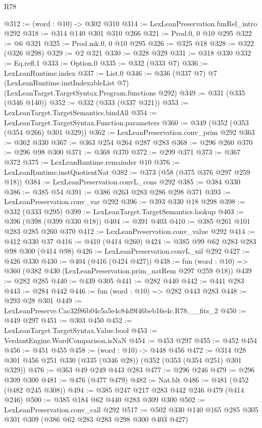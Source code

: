 \begin{lexlean}{R78}
\begin{coremodule}
@312 := (word : @10) -> @302 @310
@314 := LexLeanPreservation.funRel_intro @292
@318 := @314 @140 @301 @310 @266
@321 := Prod.{0, 0} @10 @295
@322 := @6 @321
@325 := Prod.mk.{0, 0} @10 @295
@326 := @325 @18
@328 := @322 (@326 @298)
@329 := @2 @321
@330 := @328 @329
@331 := @318 @330
@332 := Eq.refl.{1}
@333 := Option.{0}
@335 := @332 (@333 @7)
@336 := LexLeanRuntime.index
@337 := List.{0}
@346 := @336
    (@337 @7)
    @7
    (LexLeanRuntime.instIndexableList @7)
    (LexLeanTarget.TargetSyntax.Program.functions @292)
@349 := @331 (@335 (@346 @140))
@352 := @332 (@333 (@337 @321))
@353 := LexLeanTarget.TargetSemantics.bindAll
@354 := LexLeanTarget.TargetSyntax.Function.parameters
@360 := @349 (@352 (@353 (@354 @266) @301 @329))
@362 := LexLeanPreservation.conv_prim @292
@363 := @362 @330
@367 := @363 @254 @264 @287 @283
@368 := @296 @260
@370 := @296 @98 @300
@371 := @368 @370
@372 := @299 @371
@373 := @367 @372
@375 := LexLeanRuntime.remainder @10
@376 := LexLeanRuntime.instQuotientNat
@382 := @373 (@58 (@375 @376 @297 @259 @18))
@384 := LexLeanPreservation.convL_cons @292
@385 := @384 @330
@386 := @385 @54
@391 := @386 @263 @283 @286 @298 @371
@393 := LexLeanPreservation.conv_var @292
@396 := @393 @330 @18 @298
@398 := @332 (@333 @295)
@399 := LexLeanTarget.TargetSemantics.lookup
@403 := @396 (@398 (@399 @330 @18))
@404 := @391 @403
@410 := @385 @261 @101 @283 @285 @260 @370
@412 := LexLeanPreservation.conv_value @292
@414 := @412 @330 @37
@416 := @410 (@414 @260)
@424 := @385 @99 @62 @283 @283 @98 @300 (@414 @98)
@426 := LexLeanPreservation.convL_nil @292
@427 := @426 @330
@430 := @404 (@416 (@424 @427))
@438 := fun (word : @10) => @360 (@382 @430 (LexLeanPreservation.prim_natRem @297 @259 @18))
@439 := @282 @285
@440 := @439 @305
@441 := @282 @440
@442 := @441 @283
@443 := @284 @442
@446 := fun (word : @10) => @282 @443 @283
@448 := @293 @28 @301
@449 := LexLeanPreserve.Cac32f86b04c5a5e4c84d9f46beb16e4c.R78.__fits_2
@450 := @449 @297
@451 := @303 @450
@452 := LexLeanTarget.TargetSyntax.Value.bool
@453 := VerdantEngine.WordComparison.isNaN
@454 := @453 @297
@455 := @452 @454
@456 := @451 @455
@458 := (word : @10) -> @448 @456
@472 := @314 @28 @301 @456 @251 @330 (@335 (@346 @28)) (@352 (@353 (@354 @251) @301 @329))
@476 := @363 @49 @249 @443 @283
@477 := @296 @246
@479 := @296 @309 @300
@481 := @476 (@477 @479)
@482 := Nat.blt
@486 := @481 (@452 (@482 @245 @308))
@494 := @385 @247 @217 @283 @442 @246 @479 (@414 @246)
@500 := @385 @184 @62 @440 @283 @309 @300
@502 := LexLeanPreservation.conv_call @292
@517 := @502 @330 @140 @165 @285 @305 @301 @309 (@386 @62 @283 @283 @298 @300 @403 @427)

\end{coremodule}
\end{lexlean}
